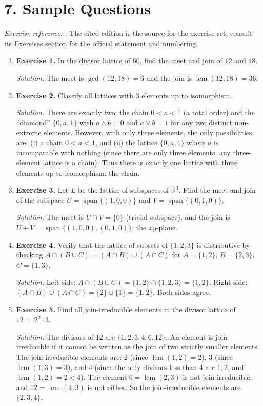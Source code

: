 \section*{7. Sample Questions}
\emph{Exercise reference:} \cite{lattice_theory_ref1}. The cited edition is the source for the exercise set; consult its Exercises section for the official statement and numbering.
\begin{enumerate}[leftmargin=*,itemsep=0.9em]
\item \textbf{Exercise 1.} In the divisor lattice of $60$, find the meet and join of $12$ and $18$.

\emph{Solution.} The meet is $\gcd(12,18)=6$ and the join is $\operatorname{lcm}(12,18)=36$.

\item \textbf{Exercise 2.} Classify all lattices with $3$ elements up to isomorphism.

\emph{Solution.} There are exactly two: the chain $0<a<1$ (a total order) and the ``diamond'' $\{0,a,1\}$ with $a\wedge b=0$ and $a\vee b=1$ for any two distinct non-extreme elements. However, with only three elements, the only possibilities are: (i) a chain $0<a<1$, and (ii) the lattice $\{0,a,1\}$ where $a$ is incomparable with nothing (since there are only three elements, any three-element lattice is a chain). Thus there is exactly one lattice with three elements up to isomorphism: the chain.

\item \textbf{Exercise 3.} Let $L$ be the lattice of subspaces of $\mathbb{R}^3$. Find the meet and join of the subspace $U=\operatorname{span}\{(1,0,0)\}$ and $V=\operatorname{span}\{(0,1,0)\}$.

\emph{Solution.} The meet is $U\cap V=\{0\}$ (trivial subspace), and the join is $U+V=\operatorname{span}\{(1,0,0),(0,1,0)\}$, the $xy$-plane.

\item \textbf{Exercise 4.} Verify that the lattice of subsets of $\{1,2,3\}$ is distributive by checking $A\cap(B\cup C)=(A\cap B)\cup(A\cap C)$ for $A=\{1,2\}$, $B=\{2,3\}$, $C=\{1,3\}$.

\emph{Solution.} Left side: $A\cap(B\cup C)=\{1,2\}\cap\{1,2,3\}=\{1,2\}$. Right side: $(A\cap B)\cup(A\cap C)=\{2\}\cup\{1\}=\{1,2\}$. Both sides agree.

\item \textbf{Exercise 5.} Find all join-irreducible elements in the divisor lattice of $12=\,2^2\cdot 3$.

\emph{Solution.} The divisors of $12$ are $\{1,2,3,4,6,12\}$. An element is join-irreducible if it cannot be written as the join of two strictly smaller elements. The join-irreducible elements are: $2$ (since $\operatorname{lcm}(1,2)=2$), $3$ (since $\operatorname{lcm}(1,3)=3$), and $4$ (since the only divisors less than $4$ are $1,2$, and $\operatorname{lcm}(1,2)=2<4$). The element $6=\operatorname{lcm}(2,3)$ is not join-irreducible, and $12=\operatorname{lcm}(4,3)$ is not either. So the join-irreducible elements are $\{2,3,4\}$.

\end{enumerate}
